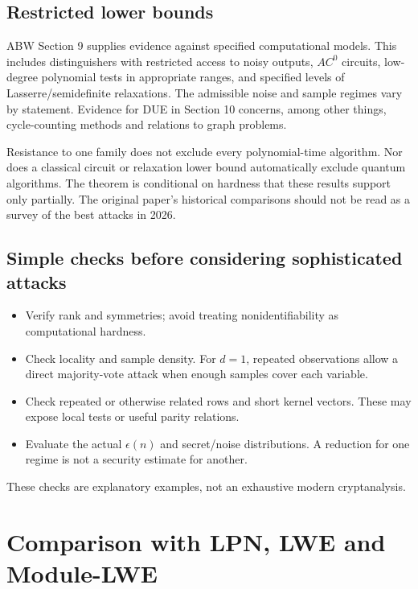 \documentclass[11pt,a4paper]{article}
\begin{document}
\subsection{Restricted lower bounds}
ABW Section 9 supplies evidence against specified computational models. This includes distinguishers with restricted access to noisy outputs, $AC^0$ circuits, low-degree polynomial tests in appropriate ranges, and specified levels of Lasserre/semidefinite relaxations. The admissible noise and sample regimes vary by statement. Evidence for DUE in Section 10 concerns, among other things, cycle-counting methods and relations to graph problems.

Resistance to one family does not exclude every polynomial-time algorithm. Nor does a classical circuit or relaxation lower bound automatically exclude quantum algorithms. The theorem is conditional on hardness that these results support only partially. The original paper's historical comparisons should not be read as a survey of the best attacks in 2026.

\subsection{Simple checks before considering sophisticated attacks}
\begin{itemize}
\item Verify rank and symmetries; avoid treating nonidentifiability as computational hardness.
\item Check locality and sample density. For $d=1$, repeated observations allow a direct majority-vote attack when enough samples cover each variable.
\item Check repeated or otherwise related rows and short kernel vectors. These may expose local tests or useful parity relations.
\item Evaluate the actual $\epsilon(n)$ and secret/noise distributions. A reduction for one regime is not a security estimate for another.
\end{itemize}
These checks are explanatory examples, not an exhaustive modern cryptanalysis.

\section{Comparison with LPN, LWE and Module-LWE}\label{sec:compare}
\end{document}
